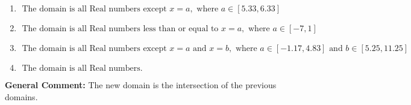 \documentclass{extbook}[14pt]
\begin{document}
\begin{enumerate}
{\begin{enumerate}[label=\Alph*.]
\item \( \text{ The domain is all Real numbers except } x = a, \text{ where } a \in [5.33, 6.33] \)


\item \( \text{ The domain is all Real numbers less than or equal to } x = a, \text{ where } a \in [-7, 1] \)


\item \( \text{ The domain is all Real numbers except } x = a \text{ and } x = b, \text{ where } a \in [-1.17, 4.83] \text{ and } b \in [5.25, 11.25] \)


\item \( \text{ The domain is all Real numbers. } \)


\end{enumerate}

\textbf{General Comment:} The new domain is the intersection of the previous domains.
}
\end{enumerate}
\end{document}
